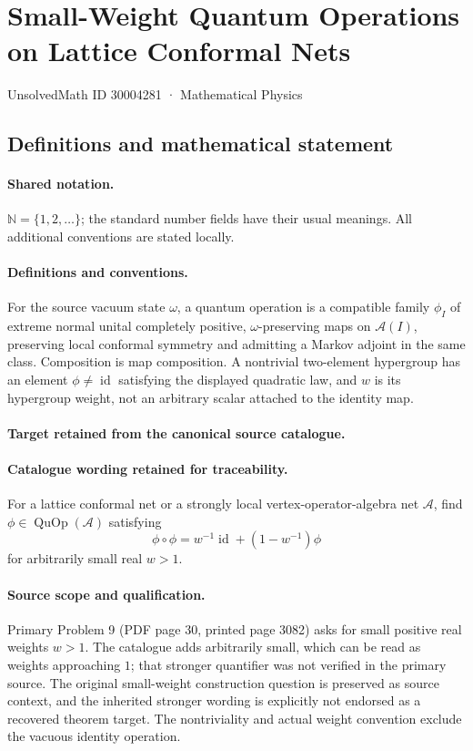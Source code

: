 \documentclass[11pt]{article}
\begin{document}
\setcounter{section}{30004280}
\section{Small-Weight Quantum Operations on Lattice Conformal Nets}\label{30004281}
{\small UnsolvedMath ID 30004281 · Mathematical Physics}
\subsection{Definitions and mathematical statement}

\paragraph{Shared notation.}$\mathbb N=\{1,2,\ldots\}$; the standard number fields have their usual meanings. All additional conventions are stated locally.


\paragraph{Definitions and conventions.}
For the source vacuum state $\omega$, a quantum operation is a compatible family $\phi_I$ of extreme normal unital completely positive, $\omega$-preserving maps on $\mathcal A(I)$, preserving local conformal symmetry and admitting a Markov adjoint in the same class. Composition is map composition. A nontrivial two-element hypergroup has an element $\phi\ne\operatorname{id}$ satisfying the displayed quadratic law, and $w$ is its hypergroup weight, not an arbitrary scalar attached to the identity map.

\paragraph{Target retained from the canonical source catalogue.}
\paragraph{Catalogue wording retained for traceability.}
For a lattice conformal net or a strongly local vertex-operator-algebra net $\mathcal A$, find $\phi\in\operatorname{QuOp}(\mathcal A)$ satisfying $$\phi\circ\phi=w^{-1}\operatorname{id}+(1-w^{-1})\phi$$ for arbitrarily small real $w>1$.

\paragraph{Source scope and qualification.}
Primary Problem 9 (PDF page 30, printed page 3082) asks for small positive real weights $w>1$. The catalogue adds arbitrarily small, which can be read as weights approaching $1$; that stronger quantifier was not verified in the primary source. The original small-weight construction question is preserved as source context, and the inherited stronger wording is explicitly not endorsed as a recovered theorem target. The nontriviality and actual weight convention exclude the vacuous identity operation.
\end{document}
